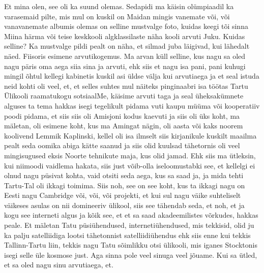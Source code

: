 Et mina olen, see oli ka suund olemas. Sedapidi ma käisin olümpiaadil ka varasemaid pilte, mis mul on kuskil on Maidan mingis vanemate või, või vanavanemate albumis olemas on selline mustvalge foto, kuidas keegi tõi sinna Miina härma või teise keskkooli algklassilaste näha kooli arvuti Juku. Kuidas selline? Ka mustvalge pildi pealt on näha, et silmad juba läigivad, kui lähedalt näed.
Fiisoris esimene arvutikogemus. Ma arvan küll selline, kus nagu sa oled nagu päris oma aega siia sina ja arvuti, ehk siis et nagu isa pani, pani kuhugi mingil õhtul kellegi kabinetis kuskil asi üldse välja kui arvutiaega ja et seal istuda neid kohti oli veel, et, et selles suhtes mul näiteks pinginaabri isa töötas Tartu Ülikooli raamatukogu sotsiaalMe, käisime arvuti taga ja seal üheksakümnete alguses ta tema hakkas isegi tegelikult pidama vuti kaupu müüma või kooperatiiv poodi pidama, et siis siis oli Amisjoni kodus kaevuti ja siis oli üks koht, ma mäletan, oli esimene koht, kus ma Amingat nägin, oli aasta või kaks noorem koolivend Lemmik Kaplinski, kellel oli isa ilmselt siis kirjanikule kuskilt maailma pealt seda oomika abiga kätte saanud ja siis olid kuulsad tähetornis oli veel mingisugused eksis Noorte tehnikute maja, kus olid jamad. Ehk siis ma ütleksin, kui niimoodi vaidlema hakata, siis just võib-olla iseloomustabki see, et kellelgi ei olnud nagu püsivat kohta, vaid otsiti seda aega, kus sa saad ja, ja mida tehti Tartu-Tal oli ikkagi toimima. Siis noh, see on see koht, kus ta ikkagi nagu on Eesti nagu Cambridge või, või, või projekti, et kui sul nagu väike suhteliselt väikeses asulas on nii domineeriv ülikool, siis see tähendab seda, et noh, et ja kogu see interneti algus ja kõik see, et et sa saad akadeemilistes võrkudes, hakkas peale. Et mäletan Tatu püsiühendused, internetiühendused, mis tekkisid, olid ju ka palju satelliidiga lootsi tähetonnist satelliidiühendus ehk siis enne kui tekkis Tallinn-Tartu liin, tekkis nagu Tatu sõimlikku otsi ülikooli, mis iganes Stocktonis isegi selle üle kosmose just. Aga sinna pole veel sinuga veel jõuame. Kui sa ütled, et sa oled nagu sinu arvutiaega, et.
